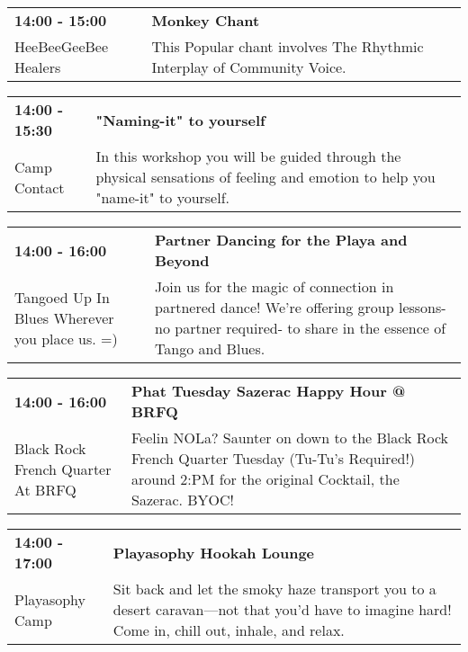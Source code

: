 \begin{tabular}{ p{1in} p{2.2in} }
    \textbf{14:00 - 15:00} & \textbf{Monkey  Chant} \\
    HeeBeeGeeBee Healers \newline  & This Popular chant involves The Rhythmic Interplay of Community Voice. \\
    \hline 
\end{tabular}
    
\begin{tabular}{ p{1in} p{2.2in} }
    \textbf{14:00 - 15:30} & \textbf{"Naming-it" to yourself} \\
    Camp Contact \newline  & In this workshop you will be guided through the physical sensations of feeling and emotion to help you "name-it" to yourself. \\
    \hline 
\end{tabular}
    
\begin{tabular}{ p{1in} p{2.2in} }
    \textbf{14:00 - 16:00} & \textbf{Partner Dancing for the Playa and Beyond} \\
    Tangoed Up In Blues \newline Wherever you place us. =) & Join us for the magic of connection in partnered dance! We're offering group lessons-no partner required- to share in the essence of Tango and Blues. \\
    \hline 
\end{tabular}
    
\begin{tabular}{ p{1in} p{2.2in} }
    \textbf{14:00 - 16:00} & \textbf{Phat Tuesday Sazerac Happy Hour @ BRFQ} \\
    Black Rock French Quarter \newline At BRFQ & Feelin NOLa?  Saunter on down to the Black Rock French Quarter Tuesday (Tu-Tu's Required!) around 2:PM for the original Cocktail, the Sazerac. BYOC! \\
    \hline 
\end{tabular}
    
\begin{tabular}{ p{1in} p{2.2in} }
    \textbf{14:00 - 17:00} & \textbf{Playasophy Hookah Lounge} \\
    Playasophy Camp \newline  & Sit back and let the smoky haze transport you to a desert caravan---not that you'd have to imagine hard! Come in, chill out, inhale, and relax. \\
    \hline 
\end{tabular}
    
